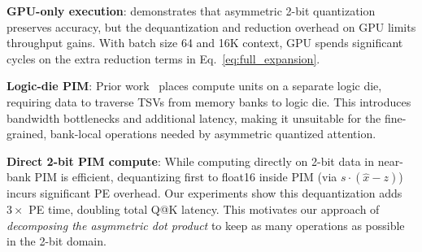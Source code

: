 \textbf{GPU-only execution}: \kivi{} demonstrates that asymmetric 2-bit quantization preserves accuracy, but the dequantization and reduction overhead on GPU limits throughput gains.
With batch size 64 and 16K context, GPU spends significant cycles on the extra reduction terms in Eq.~\ref{eq:full_expansion}.

\textbf{Logic-die PIM}: Prior work~\citep{duplex} places compute units on a separate logic die, requiring data to traverse TSVs from memory banks to logic die.
This introduces bandwidth bottlenecks and additional latency, making it unsuitable for the fine-grained, bank-local operations needed by asymmetric quantized attention.

\textbf{Direct 2-bit PIM compute}: While computing directly on 2-bit data in near-bank PIM is efficient, dequantizing first to float16 inside PIM (via $s \cdot (\hat{x} - z)$) incurs significant PE overhead.
Our experiments show this dequantization adds $3\times$ PE time, doubling total Q@K latency.
This motivates our approach of \emph{decomposing the asymmetric dot product} to keep as many operations as possible in the 2-bit domain.

